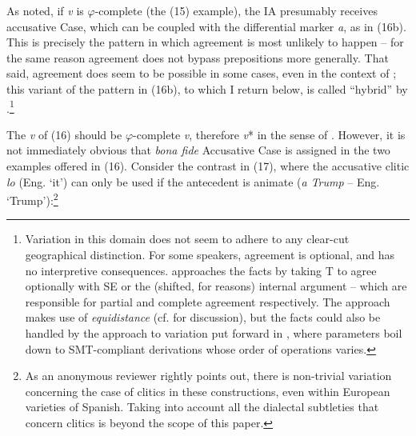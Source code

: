 \documentclass[output=paper]{langsci/langscibook}
\begin{document}
As noted, if \textit{v} is $\varphi $-complete (the (15) example), the IA presumably receives accusative Case, which can be coupled with the differential marker \textit{a}, as in (16b). This is precisely the pattern in which agreement is most unlikely to happen – for the same reason agreement does not bypass prepositions more generally. That said, agreement does seem to be possible in some cases, even in the context of \DOM; this variant of the pattern in (16b), to which I return below, is called “hybrid” by \citet{RAE-ASALE2009}.\footnote{Variation in this domain does not seem to adhere to any clear-cut geographical distinction. For some speakers, agreement is optional, and has no interpretive consequences. \citet{Planells2017} approaches the facts by taking T to agree optionally with SE or the (shifted, for \DOM reasons) internal argument – which are responsible for partial and complete agreement respectively. The approach makes use of  \textit{equidistance} (cf. \citealt{Gallego2013} for discussion), but the facts could also be handled by the approach to variation put forward in \citet{Obata2016}, where parameters boil down to SMT-compliant derivations whose order of operations varies.}

The \textit{v} of (16) should be $\varphi $-complete \textit{v}, therefore \textit{v}* in the sense of \citet{Chomsky2001Derivation}. However, it is not immediately obvious that \textit{bona fide} Accusative Case is assigned in the two examples offered in (16). Consider the contrast in (17), where the accusative clitic \textit{lo} (Eng. ‘it’) can only be used if the antecedent is animate (\textit{a Trump} – Eng. ‘Trump’):\footnote{As an anonymous reviewer rightly points out, there is non-trivial variation concerning the case of clitics in these constructions, even within European varieties of Spanish. Taking into account all the dialectal subtleties that concern clitics is beyond the scope of this paper.}

\ea%
    \label{ex:gallego:17}
    \z
\z   
\end{document}
